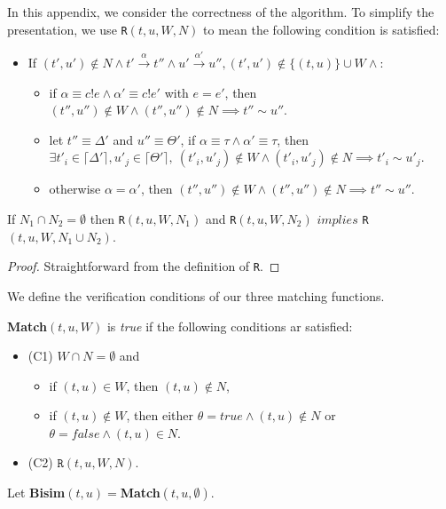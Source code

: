 \documentclass[a4paper,UKenglish,cleveref, autoref]{lipics-v2019}
\begin{document}
In this appendix, we consider the correctness of the algorithm. To simplify the presentation, we use \texttt{R}$(t,u,W,N)$ to mean the following condition is satisfied:
\begin{itemize}
    \item If $(t',u')\notin N\wedge t'\xrightarrow{\alpha}t''\wedge u'\xrightarrow{\alpha'}u'', (t',u')\notin\{(t,u)\}\cup W\wedge$: 
    \begin{itemize}
        \item if $\alpha\equiv c!e\wedge\alpha'\equiv c!e'$ with $e=e'$, then $(t'',u'')\notin W\wedge(t'',u'')\notin N\implies t''\sim u''$.
        \item let $t''\equiv \Delta'$ and $u''\equiv \Theta'$, if $\alpha\equiv \tau\wedge\alpha'\equiv \tau$, then $\exists t'_i\in \lceil\Delta'\rceil, u'_j\in \lceil\Theta'\rceil,\ (t'_i,u'_j)\notin W\wedge(t'_i,u'_j)\notin N\implies t'_i\sim u'_j$.
        \item otherwise $\alpha=\alpha'$, then  $(t'',u'')\notin W\wedge(t'',u'')\notin N\implies t''\sim u''$.
    \end{itemize}
\end{itemize}

\begin{lemma}\label{lem:n_merge}
If $N_1\cap N_2=\emptyset$ then \texttt{R}$(t,u,W,N_1)$ and \texttt{R}$(t,u,W,N_2)$ $implies$ \texttt{R}$(t,u,W,N_1\cup N_2)$.
\end{lemma}
\begin{proof}
Straightforward from the definition of \texttt{R}.
\end{proof}

We define the verification conditions of our three matching functions.
\begin{definition}\label{def:match}
\textbf{Match}$(t,u,W)$ is \textit{true} if the following conditions ar satisfied:
\begin{itemize}
    \item(C1) $W\cap N=\emptyset$ and
    \begin{itemize}
        \item if $(t,u)\in W$, then $(t,u)\notin N$,
        \item if $(t,u)\notin W$, then either $\theta=true\wedge(t,u)\notin N$ or $\theta=false\wedge(t,u)\in N$.
    \end{itemize}
    \item(C2) $\texttt{R}(t,u,W,N)$.
\end{itemize}
Let \textbf{Bisim}$(t,u)=$\textbf{Match}$(t,u,\emptyset)$.
\end{definition}
\end{document}
